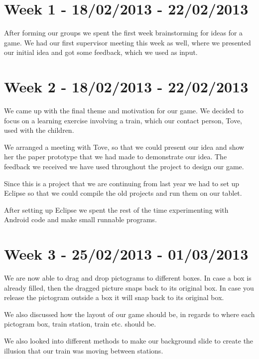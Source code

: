 
\section*{Week 1 - 18/02/2013 - 22/02/2013}

After forming our groups we spent the first week brainstorming for ideas for a game. We had our first supervisor meeting this week as well, where we presented our initial idea and got some feedback, which we used as input. 

\section*{Week 2 - 18/02/2013 - 22/02/2013} 

We came up with the final theme and motivation for our game. We decided to focus on a learning exercise involving a train, which our contact person, Tove, used with the children. 

We arranged a meeting with Tove, so that we could present our idea and show her the paper prototype that we had made to demonstrate our idea. The feedback we received we have used throughout the project to design our game. 

Since this is a project that we are continuing from last year we had to set up Eclipse so that we could compile the old projects and run them on our tablet. 

After setting up Eclipse we spent the rest of the time experimenting with Android code and make small runnable programs. 

\section*{Week 3 - 25/02/2013 - 01/03/2013}

We are now able to drag and drop pictograms to different boxes. In case a box is already filled, then the dragged picture snaps back to its original box. In case you release the pictogram outside a box it will snap back to its original box. 

We also discussed how the layout of our game should be, in regards to where each pictogram box, train station, train etc. should be. 

We also looked into different methods to make our background slide to create the illusion that our train was moving between stations. 

